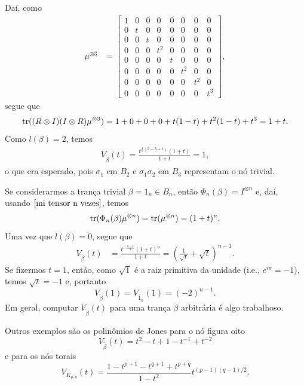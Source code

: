 	Daí, como
	\begin{align*}
	    \mu^{\otimes 3} &= \begin{bmatrix}
	    1 & 0 & 0 & 0 & 0 & 0 & 0 & 0 \\
	    0 & t & 0 & 0 & 0 & 0 & 0 & 0 \\
	    0 & 0 & t & 0 & 0 & 0 & 0 & 0 \\
	    0 & 0 & 0 & t^2 & 0 & 0 & 0 & 0 \\
	    0 & 0 & 0 & 0 & t & 0 & 0 & 0 \\
	    0 & 0 & 0 & 0 & 0 & t^2 & 0 & 0 \\
	    0 & 0 & 0 & 0 & 0 & 0 & t^2 & 0 \\
	    0 & 0 & 0 & 0 & 0 & 0 & 0 & t^3
	    \end{bmatrix},    
	\end{align*}
	segue que
	\begin{align*}
	    \operatorname{tr}((R\otimes I)(I\otimes R)\mu^{\otimes 3}) = 1 + 0 + 0 + 0 + t(1-t) + t^2(1-t) + t^3 = 1 + t.
	\end{align*}
	Como $l(\beta) = 2$, temos
	\begin{align*}
	    V_{\widetilde{\beta}}(t) = \frac{t^{\frac{1}{2}(2-3+1)} (1+t)}{1+t} = 1,
	\end{align*}
	o que era esperado, pois $\sigma_1$ em $B_2$ e $\sigma_1\sigma_2$ em $B_3$ representam o nó trivial.
	
	\par\vspace{0.3cm} Se considerarmos a trança trivial $\beta =1_n\in B_n$, então 
	$\Phi_n(\beta) = I^{\otimes n}$ e, daí, usando $\eqref{mi tensor n vezes}$, temos
	\begin{equation*}
	    \operatorname{tr}( \Phi_n(\beta)\mu^{\otimes n} ) = \operatorname{tr}(\mu^{\otimes n}) = (1+t)^n.
	\end{equation*} 
	Uma vez que $l(\beta) = 0$, segue que
	\begin{align*}
	    V_{\widetilde{\beta}}(t) &= \frac{t^{-\frac{n-1}{2}} (1+t)^n}{1+t}
	    = \left( \frac{1}{\sqrt{t}} + \sqrt{t} \right)^{n-1}.
	\end{align*}
	Se fizermos $t=1$, então, como $\sqrt{1}$ é a raiz primitiva da unidade (i.e., $e^{i\pi} = -1$), 
	temos $\sqrt{t} = -1$ e, portanto
	\begin{equation}
	\label{polinomio de jones tranca trivial}
	    V_{\widetilde{\beta}}(1) = V_{\widetilde{1_n}}(1) = (-2)^{n-1}.
	\end{equation}
	Em geral, computar $V_{\widetilde{\beta}}(t)$ para uma trança $\beta$ arbitrária é algo trabalhoso.
	\begin{example}
    	Outros exemplos são os polinômios de Jones para o nó figura oito 
    	\begin{equation*}
    	    V_{\widetilde{\beta}}(t) = t^2 - t + 1 - t^{-1} + t^{-2}  
    	\end{equation*}
    	e para os nós torais
    	\begin{equation*}
    	    V_{K_{p,q}}(t) = \frac{1-t^{p+1}-t^{q+1} + t^{p+q}}{1-t^2}t^{(p-1)(q-1)/2}.
    	\end{equation*}
	\end{example}
